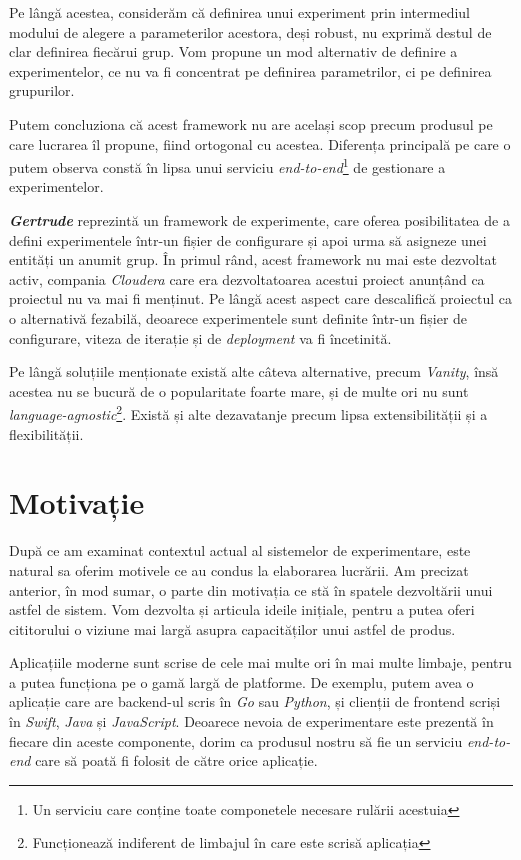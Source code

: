 Pe lângă acestea, considerăm că definirea unui experiment prin intermediul modului de alegere a parameterilor acestora, deși robust, nu exprimă destul de clar definirea fiecărui grup. Vom propune un mod alternativ de definire a experimentelor, ce nu va fi concentrat pe definirea parametrilor, ci pe definirea grupurilor. 

Putem concluziona că acest framework nu are același scop precum produsul pe care lucrarea îl propune, fiind ortogonal cu acestea. Diferența principală pe care o putem observa constă în lipsa unui serviciu \textit{end-to-end}\footnote{Un serviciu care conține toate componetele necesare rulării acestuia} de gestionare a experimentelor.

\textbf{\textit{Gertrude}} reprezintă un framework de experimente, care oferea posibilitatea de a defini experimentele într-un fișier de configurare și apoi urma să asigneze unei entități un anumit grup. În primul rând, acest framework nu mai este dezvoltat activ, compania \textit{Cloudera} care era dezvoltatoarea acestui proiect anunțând ca proiectul nu va mai fi menținut. Pe lângă acest aspect care descalifică proiectul ca o alternativă fezabilă, deoarece experimentele sunt definite într-un fișier de configurare, viteza de iterație și de \textit{deployment} va fi încetinită. 

Pe lângă soluțiile menționate există alte câteva alternative, precum \textit{Vanity}, însă acestea nu se bucură de o popularitate foarte mare, și de multe ori nu sunt \textit{language-agnostic}\footnote{Funcționează indiferent de limbajul în care este scrisă aplicația}. Există și alte dezavatanje precum lipsa extensibilității și a flexibilității.

\section{Motivație}

După ce am examinat contextul actual al sistemelor de experimentare, este natural sa oferim motivele ce au condus la elaborarea lucrării. Am precizat anterior, în mod sumar, o parte din motivația ce stă în spatele dezvoltării unui astfel de sistem. Vom dezvolta și articula ideile inițiale, pentru a putea oferi cititorului o viziune mai largă asupra capacităților unui astfel de produs.

Aplicațiile moderne sunt scrise de cele mai multe ori în mai multe limbaje, pentru a putea funcționa pe o gamă largă de platforme. De exemplu, putem avea o aplicație care are backend-ul scris în \textit{Go} sau \textit{Python}, și clienții de frontend scriși în \textit{Swift}, \textit{Java} și \textit{JavaScript}. Deoarece nevoia de experimentare este prezentă în fiecare din aceste componente, dorim ca produsul nostru să fie un serviciu \textit{end-to-end} care să poată fi folosit de către orice aplicație. 

